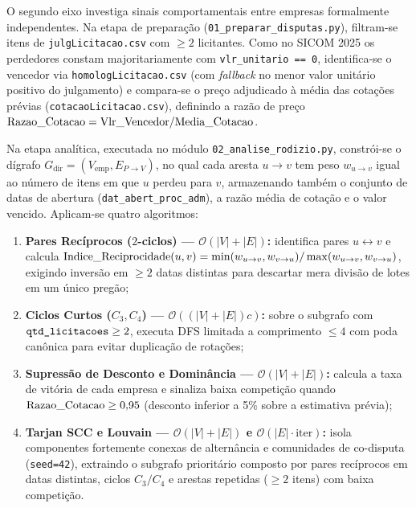 O segundo eixo investiga sinais comportamentais entre empresas formalmente independentes. Na etapa de preparação (\texttt{01\_\allowbreak preparar\_\allowbreak disputas\allowbreak .py}), filtram-se itens de \texttt{julg\allowbreak Licitacao\allowbreak .csv} com $\ge 2$ licitantes. Como no SICOM 2025 os perdedores constam majoritariamente com \texttt{vlr\_\allowbreak unitario == 0}, identifica-se o vencedor via \texttt{homolog\allowbreak Licitacao\allowbreak .csv} (com \textit{fallback} no menor valor unitário positivo do julgamento) e compara-se o preço adjudicado à média das cotações prévias (\texttt{cotacao\allowbreak Licitacao\allowbreak .csv}), definindo a razão de preço $\text{Razao\_\allowbreak Cotacao} = \text{Vlr\_\allowbreak Vencedor} / \text{Media\_\allowbreak Cotacao}$.

Na etapa analítica, executada no módulo \texttt{02\_\allowbreak analise\_\allowbreak rodizio\allowbreak .py}, constrói-se o dígrafo $G_{\text{dir}} = (V_{\text{emp}}, E_{P \to V})$, no qual cada aresta $u \to v$ tem peso $w_{u\to v}$ igual ao número de itens em que $u$ perdeu para $v$, armazenando também o conjunto de datas de abertura (\texttt{dat\_\allowbreak abert\_\allowbreak proc\_\allowbreak adm}), a razão média de cotação e o valor vencido. Aplicam-se quatro algoritmos:
\begin{enumerate}
  \item \textbf{Pares Recíprocos ($2$-ciclos) — $\mathcal{O}(|V|+|E|)$:} identifica pares $u \leftrightarrow v$ e calcula $\text{Indice\_\allowbreak Reciprocidade}(u,v) = \min(w_{u\to v}, w_{v\to u}) / \max(w_{u\to v}, w_{v\to u})$, exigindo inversão em $\ge 2$ datas distintas para descartar mera divisão de lotes em um único pregão;
  \item \textbf{Ciclos Curtos ($C_3, C_4$) — $\mathcal{O}((|V|+|E|)c)$:} sobre o subgrafo com $\texttt{qtd\_\allowbreak licitacoes} \ge 2$, executa DFS limitada a comprimento $\le 4$ com poda canônica para evitar duplicação de rotações;
  \item \textbf{Supressão de Desconto e Dominância — $\mathcal{O}(|V|+|E|)$:} calcula a taxa de vitória de cada empresa e sinaliza baixa competição quando $\text{Razao\_\allowbreak Cotacao} \ge 0{,}95$ (desconto inferior a 5\% sobre a estimativa prévia);
  \item \textbf{Tarjan SCC e Louvain — $\mathcal{O}(|V|+|E|)$ e $\mathcal{O}(|E|\cdot\text{iter})$:} isola componentes fortemente conexas de alternância e comunidades de co-disputa (\texttt{seed=42}), extraindo o subgrafo prioritário composto por pares recíprocos em datas distintas, ciclos $C_3/C_4$ e arestas repetidas ($\ge 2$ itens) com baixa competição.
\end{enumerate}

